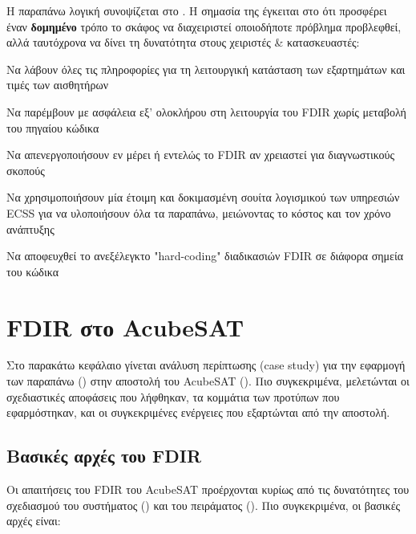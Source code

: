 \documentclass[a4paper,nobib]{tufte-book}
\begin{document}
Η παραπάνω λογική συνοψίζεται στο . Η σημασία της έγκειται στο ότι προσφέρει έναν \textbf{δομημένο} τρόπο το σκάφος να διαχειριστεί οποιοδήποτε πρόβλημα προβλεφθεί, αλλά ταυτόχρονα να δίνει τη δυνατότητα στους χειριστές \& κατασκευαστές:
\begin{compactitem}
	\item Να λάβουν όλες τις πληροφορίες για τη λειτουργική κατάσταση των εξαρτημάτων και τιμές των αισθητήρων
	\item Να παρέμβουν με ασφάλεια εξ' ολοκλήρου στη λειτουργία του \acs{FDIR} χωρίς μεταβολή του πηγαίου κώδικα
	\item Να απενεργοποιήσουν εν μέρει ή εντελώς το \acs{FDIR} αν χρειαστεί για διαγνωστικούς σκοπούς
	\item Να χρησιμοποιήσουν μία έτοιμη και δοκιμασμένη σουίτα λογισμικού των υπηρεσιών \acs{ECSS} για να υλοποιήσουν όλα τα παραπάνω, μειώνοντας το κόστος και τον χρόνο ανάπτυξης
	\item Να αποφευχθεί το ανεξέλεγκτο "hard-coding" διαδικασιών \acs{FDIR} σε διάφορα σημεία του κώδικα
\end{compactitem}


\chapter{\acs{FDIR} στο AcubeSAT}
\label{cap:acufdir}

Στο παρακάτω κεφάλαιο γίνεται ανάλυση περίπτωσης (case study) για την εφαρμογή των παραπάνω () στην αποστολή του AcubeSAT (). Πιο συγκεκριμένα, μελετώνται οι σχεδιαστικές αποφάσεις που λήφθηκαν, τα κομμάτια των προτύπων που εφαρμόστηκαν, και οι συγκεκριμένες ενέργειες που εξαρτώνται από την αποστολή. \parencite{FMEA}

\section{Βασικές αρχές του \acs{FDIR}}
\label{sec:fdirbaspri}

Οι απαιτήσεις του \acs{FDIR} του AcubeSAT προέρχονται κυρίως από τις δυνατότητες του σχεδιασμού του συστήματος () και του πειράματος (). Πιο συγκεκριμένα, οι βασικές αρχές είναι:
\end{document}
